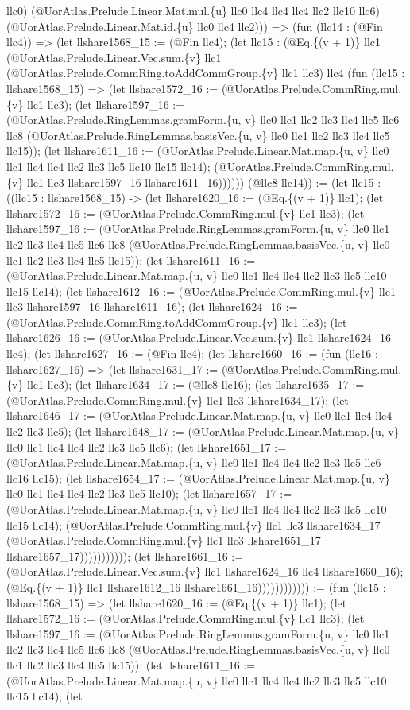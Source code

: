 \documentclass[11pt]{article}
\begin{document}
llc0) (@UorAtlas.Prelude.Linear.Mat.mul.\{u\} llc0 llc4 llc4 llc4 llc2 llc10 llc6) (@UorAtlas.Prelude.Linear.Mat.id.\{u\} llc0 llc4 llc2))) => (fun (llc14 : (@Fin llc4)) => (let llshare1568\_15 := (@Fin llc4); (let llc15 : (@Eq.\{(v + 1)\} llc1 (@UorAtlas.Prelude.Linear.Vec.sum.\{v\} llc1 (@UorAtlas.Prelude.CommRing.toAddCommGroup.\{v\} llc1 llc3) llc4 (fun (llc15 : llshare1568\_15) => (let llshare1572\_16 := (@UorAtlas.Prelude.CommRing.mul.\{v\} llc1 llc3); (let llshare1597\_16 := (@UorAtlas.Prelude.RingLemmas.gramForm.\{u, v\} llc0 llc1 llc2 llc3 llc4 llc5 llc6 llc8 (@UorAtlas.Prelude.RingLemmas.basisVec.\{u, v\} llc0 llc1 llc2 llc3 llc4 llc5 llc15)); (let llshare1611\_16 := (@UorAtlas.Prelude.Linear.Mat.map.\{u, v\} llc0 llc1 llc4 llc4 llc2 llc3 llc5 llc10 llc15 llc14); (@UorAtlas.Prelude.CommRing.mul.\{v\} llc1 llc3 llshare1597\_16 llshare1611\_16)))))) (@llc8 llc14)) := (let llc15 : ((llc15 : llshare1568\_15) -> (let llshare1620\_16 := (@Eq.\{(v + 1)\} llc1); (let llshare1572\_16 := (@UorAtlas.Prelude.CommRing.mul.\{v\} llc1 llc3); (let llshare1597\_16 := (@UorAtlas.Prelude.RingLemmas.gramForm.\{u, v\} llc0 llc1 llc2 llc3 llc4 llc5 llc6 llc8 (@UorAtlas.Prelude.RingLemmas.basisVec.\{u, v\} llc0 llc1 llc2 llc3 llc4 llc5 llc15)); (let llshare1611\_16 := (@UorAtlas.Prelude.Linear.Mat.map.\{u, v\} llc0 llc1 llc4 llc4 llc2 llc3 llc5 llc10 llc15 llc14); (let llshare1612\_16 := (@UorAtlas.Prelude.CommRing.mul.\{v\} llc1 llc3 llshare1597\_16 llshare1611\_16); (let llshare1624\_16 := (@UorAtlas.Prelude.CommRing.toAddCommGroup.\{v\} llc1 llc3); (let llshare1626\_16 := (@UorAtlas.Prelude.Linear.Vec.sum.\{v\} llc1 llshare1624\_16 llc4); (let llshare1627\_16 := (@Fin llc4); (let llshare1660\_16 := (fun (llc16 : llshare1627\_16) => (let llshare1631\_17 := (@UorAtlas.Prelude.CommRing.mul.\{v\} llc1 llc3); (let llshare1634\_17 := (@llc8 llc16); (let llshare1635\_17 := (@UorAtlas.Prelude.CommRing.mul.\{v\} llc1 llc3 llshare1634\_17); (let llshare1646\_17 := (@UorAtlas.Prelude.Linear.Mat.map.\{u, v\} llc0 llc1 llc4 llc4 llc2 llc3 llc5); (let llshare1648\_17 := (@UorAtlas.Prelude.Linear.Mat.map.\{u, v\} llc0 llc1 llc4 llc4 llc2 llc3 llc5 llc6); (let llshare1651\_17 := (@UorAtlas.Prelude.Linear.Mat.map.\{u, v\} llc0 llc1 llc4 llc4 llc2 llc3 llc5 llc6 llc16 llc15); (let llshare1654\_17 := (@UorAtlas.Prelude.Linear.Mat.map.\{u, v\} llc0 llc1 llc4 llc4 llc2 llc3 llc5 llc10); (let llshare1657\_17 := (@UorAtlas.Prelude.Linear.Mat.map.\{u, v\} llc0 llc1 llc4 llc4 llc2 llc3 llc5 llc10 llc15 llc14); (@UorAtlas.Prelude.CommRing.mul.\{v\} llc1 llc3 llshare1634\_17 (@UorAtlas.Prelude.CommRing.mul.\{v\} llc1 llc3 llshare1651\_17 llshare1657\_17))))))))))); (let llshare1661\_16 := (@UorAtlas.Prelude.Linear.Vec.sum.\{v\} llc1 llshare1624\_16 llc4 llshare1660\_16); (@Eq.\{(v + 1)\} llc1 llshare1612\_16 llshare1661\_16)))))))))))) := (fun (llc15 : llshare1568\_15) => (let llshare1620\_16 := (@Eq.\{(v + 1)\} llc1); (let llshare1572\_16 := (@UorAtlas.Prelude.CommRing.mul.\{v\} llc1 llc3); (let llshare1597\_16 := (@UorAtlas.Prelude.RingLemmas.gramForm.\{u, v\} llc0 llc1 llc2 llc3 llc4 llc5 llc6 llc8 (@UorAtlas.Prelude.RingLemmas.basisVec.\{u, v\} llc0 llc1 llc2 llc3 llc4 llc5 llc15)); (let llshare1611\_16 := (@UorAtlas.Prelude.Linear.Mat.map.\{u, v\} llc0 llc1 llc4 llc4 llc2 llc3 llc5 llc10 llc15 llc14); (let 
\end{document}
